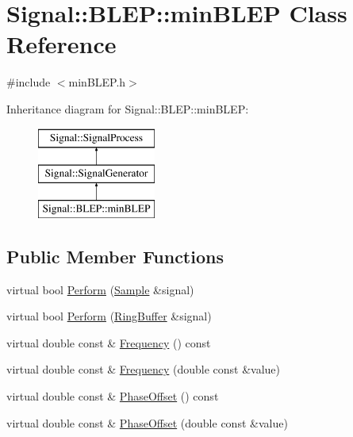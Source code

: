 \hypertarget{classSignal_1_1BLEP_1_1minBLEP}{\section{Signal\+:\+:B\+L\+E\+P\+:\+:min\+B\+L\+E\+P Class Reference}
\label{classSignal_1_1BLEP_1_1minBLEP}
}


{\ttfamily \#include $<$min\+B\+L\+E\+P.\+h$>$}

Inheritance diagram for Signal\+:\+:B\+L\+E\+P\+:\+:min\+B\+L\+E\+P\+:\begin{figure}[H]
\begin{center}
\leavevmode
\includegraphics[height=3.000000cm]{classSignal_1_1BLEP_1_1minBLEP}
\end{center}
\end{figure}
\subsection*{Public Member Functions}
\begin{DoxyCompactItemize}
\item 
virtual bool \hyperlink{classSignal_1_1SignalGenerator_a2cd9061c5ae40a392a9476551b4379f3}{Perform} (\hyperlink{classSignal_1_1Sample}{Sample} \&signal)
\item 
virtual bool \hyperlink{classSignal_1_1SignalGenerator_a126d52dd9b6b14d33efc624e2c89284e}{Perform} (\hyperlink{classSignal_1_1RingBuffer}{Ring\+Buffer} \&signal)
\item 
virtual double const \& \hyperlink{classSignal_1_1SignalGenerator_a96af42ee68f94e9b04d034fd68b73ecd}{Frequency} () const 
\item 
virtual double const \& \hyperlink{classSignal_1_1SignalGenerator_af83b532bf3ddc3637c2fd7a1dfd095cb}{Frequency} (double const \&value)
\item 
virtual double const \& \hyperlink{classSignal_1_1SignalGenerator_ac2538ec946f001e394d2416fda698d1c}{Phase\+Offset} () const 
\item 
virtual double const \& \hyperlink{classSignal_1_1SignalGenerator_ac6a103ff72beaa338f6d18c812522d78}{Phase\+Offset} (double const \&value)
\end{DoxyCompactItemize}
